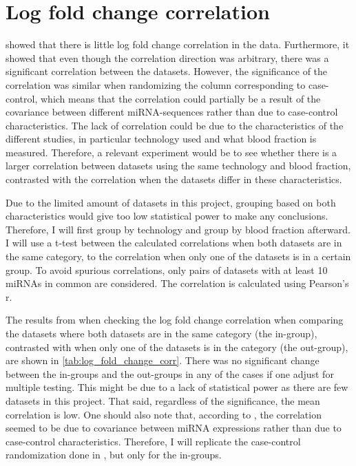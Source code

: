 \section{Log fold change correlation}
\label{sec:res_log_fold_change}
\citet{forprosjekt} showed that there is little log fold change correlation in the data. Furthermore, it showed that even though the correlation direction was arbitrary, there was a significant correlation between the datasets. However, the significance of the correlation was similar when randomizing the column corresponding to case-control, which means that the correlation could partially be a result of the covariance between different miRNA-sequences rather than due to case-control characteristics. The lack of correlation could be due to the characteristics of the different studies, in particular technology used and what blood fraction is measured. Therefore, a relevant experiment would be to see whether there is a larger correlation between datasets using the same technology and blood fraction, contrasted with the correlation when the datasets differ in these characteristics.

Due to the limited amount of datasets in this project, grouping based on both characteristics would give too low statistical power to make any conclusions. Therefore, I will first group by technology and group by blood fraction afterward. I will use a t-test between the calculated correlations when both datasets are in the same category, to the correlation when only one of the datasets is in a certain group. To avoid spurious correlations, only pairs of datasets with at least 10 miRNAs in common are considered. The correlation is calculated using Pearson's r.

The results from when checking the log fold change correlation when comparing the datasets where both datasets are in the same category (the in-group), contrasted with when only one of the datasets is in the category (the out-group), are shown in \autoref{tab:log_fold_change_corr}. There was no significant change between the in-groups and the out-groups in any of the cases if one adjust for multiple testing. This might be due to a lack of statistical power as there are few datasets in this project. That said, regardless of the significance, the mean correlation is low. One should also note that, according to \citet{forprosjekt}, the correlation seemed to be due to covariance between miRNA expressions rather than due to case-control characteristics. Therefore, I will replicate the case-control randomization done in \citet{forprosjekt}, but only for the in-groups.

